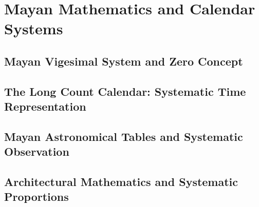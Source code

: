 
\chapter{Mayan Mathematics and Calendar Systems}

\section{Mayan Vigesimal System and Zero Concept}

\section{The Long Count Calendar: Systematic Time Representation}

\section{Mayan Astronomical Tables and Systematic Observation}

\section{Architectural Mathematics and Systematic Proportions}

